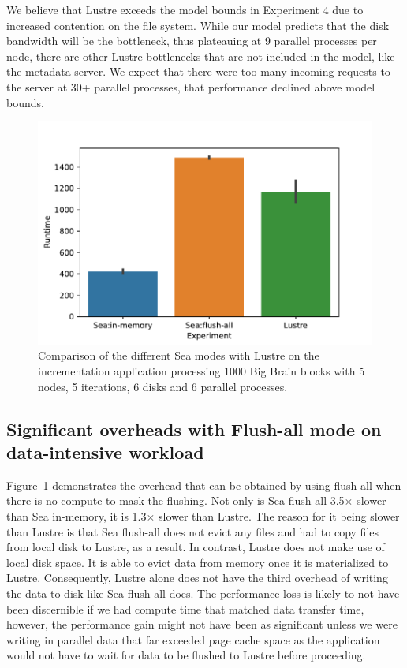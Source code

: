       We believe that Lustre exceeds the model bounds in Experiment 4 due to
      increased contention on the file system. While our model predicts that the
      disk bandwidth will be the bottleneck, thus plateauing at 9 parallel
      processes per node, there are other Lustre bottlenecks that are not
      included in the model, like the metadata server. We expect that there were
      too many incoming requests to the server at 30+ parallel processes, that
      performance declined above model bounds. 
      

    \begin{figure}

        \centering
        \includegraphics[width=\columnwidth]{figures/sea-comp/flushall.pdf}%
        \caption{Comparison of the different Sea modes with Lustre on the
        incrementation application processing 1000 Big Brain blocks with 5
        nodes, 5 iterations, 6 disks and 6 parallel processes.}
    \label{fig:sea-comp:flush}
    \end{figure}

      \subsection{Significant overheads with Flush-all mode on data-intensive workload}

      Figure~\ref{fig:sea-comp:flush} demonstrates the overhead that can be
      obtained by using flush-all when there is no compute to mask the flushing.
      Not only is Sea flush-all 3.5$\times$ slower than Sea in-memory, it is
      1.3$\times$ slower than Lustre. The reason for it being slower than Lustre
      is that Sea flush-all does not evict any files and had to copy files from
      local disk to Lustre, as a result. In contrast, Lustre does not make use
      of local disk space. It is able to evict data from memory once it is
      materialized to Lustre. Consequently, Lustre alone does not have the third
      overhead of writing the data to disk like Sea flush-all does. The
      performance loss is likely to not have been discernible if we had compute
      time that matched data transfer time, however, the performance gain might
      not have been as significant unless we were writing in parallel data that
      far exceeded page cache space as the application would not have to wait
      for data to be flushed to Lustre before proceeding.

